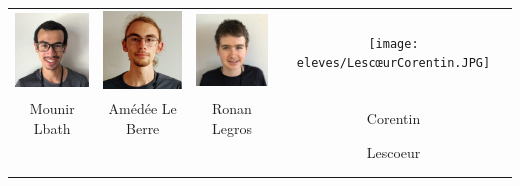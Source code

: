 \vfill
\pagebreak

\begin{center}
\begin{tabular}{cccc}
\includegraphics[angle=270,origin=c, width=27mm]{eleves/Lbath Mounir.JPG} &
\includegraphics[angle=0,origin=c, width=27mm]{eleves/Le Berre Amédée.JPG} &
\includegraphics[angle=270,origin=c, width=27mm]{eleves/Legros Ronan.JPG} &
\texttt{[image: eleves/LescœurCorentin.JPG]} \\
Mounir Lbath & Amédée Le Berre & Ronan Legros & Corentin \\ & & & Lescoeur \\ \\ \\ 


\end{tabular}
\end{center}
